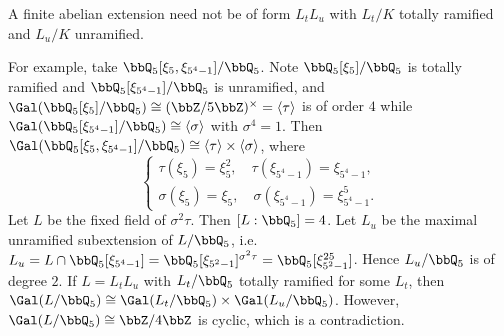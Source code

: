   \begin{example}
    A finite abelian extension need not be of form $L_t L_u$ with $L_t/K$ totally ramified and $L_u/K$ unramified.
     
    For example, take $\bbQ_5[\xi_5,\xi_{5^4-1}]/\bbQ_5$.
    Note $\bbQ_5[\xi_5]/\bbQ_5$ is totally ramified and $\bbQ_5[\xi_{5^4-1}]/\bbQ_5$ is unramified, 
    and $\Gal(\bbQ_5[\xi_5]/\bbQ_5) \cong (\bbZ/5\bbZ)^\times = \left<\tau\right>$ is of order $4$ while $\Gal(\bbQ_5[\xi_{5^4-1}]/\bbQ_5) \cong \left<\sigma\right>$ with $\sigma^4 = 1$.
    Then $\Gal(\bbQ_5[\xi_5,\xi_{5^4-1}]/\bbQ_5) \cong \left<\tau\right> \times \left<\sigma\right>$, where 
    \[ \begin{cases}
        \tau(\xi_5) = \xi_5^2, \quad \tau(\xi_{5^4-1}) = \xi_{5^4-1}, \\
        \sigma(\xi_5) = \xi_5, \quad \sigma(\xi_{5^4-1}) = \xi_{5^4-1}^5.
    \end{cases} \]
    Let $L$ be the fixed field of $\sigma^2 \tau$.
    Then $[L:\bbQ_5] = 4$.
    Let $L_u$ be the maximal unramified subextension of $L/\bbQ_5$, i.e. $L_u = L \cap \bbQ_5[\xi_{5^4-1}] = \bbQ_5[\xi_{5^2-1}]^{\sigma^2 \tau} = \bbQ_5[\xi_{5^2-1}^{25}]$.
    Hence $L_u/\bbQ_5$ is of degree $2$.
    If $L = L_t L_u$ with $L_t/\bbQ_5$ totally ramified for some $L_t$, 
    then $\Gal(L/\bbQ_5) \cong \Gal(L_t/\bbQ_5) \times \Gal(L_u/\bbQ_5)$.
    However, $\Gal(L/\bbQ_5) \cong \bbZ/4\bbZ$ is cyclic, which is a contradiction.
  \end{example}

